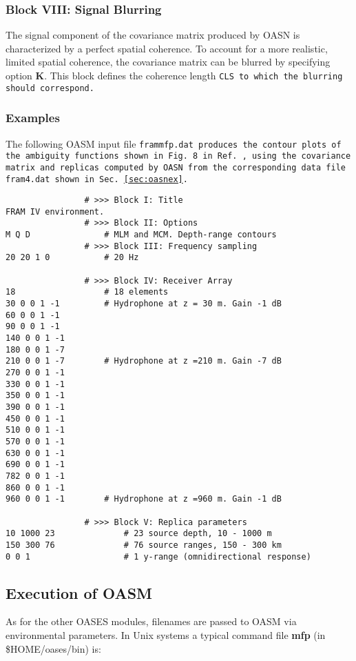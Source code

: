 \subsubsection{Block VIII: Signal Blurring}

The signal component of the covariance matrix produced by OASN is
characterized by a
perfect spatial coherence. To account for a more realistic, limited
spatial coherence, the covariance matrix can be blurred by specifying
option {\bf K}. This block defines the coherence length \tt CLS \rm 
to which the blurring should correspond.

\subsubsection{Examples}

The following OASM input file \tt frammfp.dat \rm
produces the contour plots of the ambiguity functions shown in
Fig.~8 in Ref.~\cite{sbk:jasa90}, using the covariance matrix and
replicas computed by OASN from the corresponding data file \tt
fram4.dat \rm shown in Sec.~\ref{sec:oasnex}.  

\small
\begin{verbatim}
                # >>> Block I: Title
FRAM IV environment.
                # >>> Block II: Options
M Q D               # MLM and MCM. Depth-range contours
                # >>> Block III: Frequency sampling
20 20 1 0           # 20 Hz

                # >>> Block IV: Receiver Array 
18                  # 18 elements
30 0 0 1 -1         # Hydrophone at z = 30 m. Gain -1 dB
60 0 0 1 -1
90 0 0 1 -1
140 0 0 1 -1
180 0 0 1 -7
210 0 0 1 -7        # Hydrophone at z =210 m. Gain -7 dB
270 0 0 1 -1
330 0 0 1 -1
350 0 0 1 -1
390 0 0 1 -1
450 0 0 1 -1
510 0 0 1 -1
570 0 0 1 -1
630 0 0 1 -1
690 0 0 1 -1
782 0 0 1 -1
860 0 0 1 -1
960 0 0 1 -1        # Hydrophone at z =960 m. Gain -1 dB

                # >>> Block V: Replica parameters
10 1000 23              # 23 source depth, 10 - 1000 m
150 300 76              # 76 source ranges, 150 - 300 km
0 0 1                   # 1 y-range (omnidirectional response)
\end{verbatim}
\normalsize

\subsection{Execution of OASM}

    As  for the other OASES modules,  filenames  are  passed  to OASM   via 
environmental parameters. In Unix systems a typical command  file 
{\bf mfp} (in  \$HOME/oases/bin) is:

